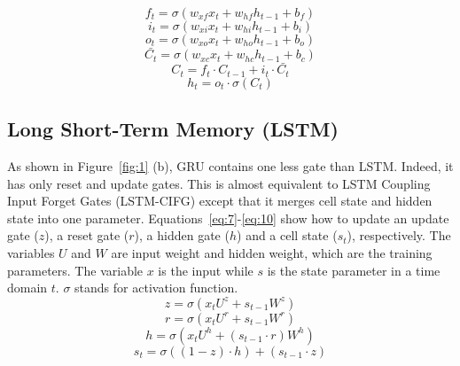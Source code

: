 \begin{equation}
f_t=\sigma(w_{xf}x_t+w_{hf}h_{t-1}+b_f)
\label{eq:1}
\end{equation}
\begin{equation}
i_t=\sigma(w_{xi}x_t+w_{hi}h_{t-1}+b_i)
\label{eq:2}
\end{equation}
\begin{equation}
o_t=\sigma(w_{xo}x_t+w_{ho}h_{t-1}+b_o)
\label{eq:3}
\end{equation}
\begin{equation}
\bar{C_t}=\sigma(w_{xc}x_t+w_{hc}h_{t-1}+b_c)
\label{eq:4}
\end{equation}
\begin{equation}
C_t=f_t \cdot C_{t-1}+i_t \cdot \bar{C_t}
\label{eq:5}
\end{equation}
\begin{equation}
h_t  = o_t\cdot \sigma(C_t)
\label{eq:6}
\end{equation}


\subsection{Long Short-Term Memory (LSTM)}
As shown in Figure~\ref{fig:1} (b), GRU contains one less gate than LSTM. 
Indeed, it has only reset and update gates.
This is almost equivalent to LSTM Coupling Input Forget Gates (LSTM-CIFG)
except that it merges cell state and hidden state into one parameter. 
Equations~\ref{eq:7}-\ref{eq:10} show how to update an update gate ($z$), 
a reset gate ($r$), a hidden gate ($h$) and a cell state ($s_t$), 
respectively. The variables $U$ and $W$ are input weight and hidden weight, 
which are the training parameters. The variable $x$ is the input while $s$ 
is the state parameter in a time domain $t$. $\sigma$ stands for activation function.
\begin{equation}
z = \sigma(x_tU^z+s_{t-1}W^z)
\label{eq:7}
\end{equation}
\begin{equation}
r = \sigma(x_tU^r+s_{t-1}W^r)
\label{eq:8}
\end{equation}
\begin{equation}
h = \sigma(x_tU^h+(s_{t-1} \cdot r)W^h)
\label{eq:9}
\end{equation}
\begin{equation}
s_t  = \sigma((1-z)\cdot h)+(s_{t-1} \cdot z)
\label{eq:10}
\end{equation}

